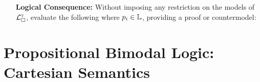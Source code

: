\documentclass[a4paper, 11pt]{article} %
\begin{document}
\begin{enumerate}[leftmargin=1.2in]
  \item[\bf Logical Consequence:] Without imposing any restriction on the models of $\mathcal{L}^{\textsc{t}}_\square$, evaluate the following where $p_i \in \mathbb{L}$, providing a proof or countermodel:
    \begin{enumerate}[label=\arabic*.,resume]\small
    \end{enumerate}
\end{enumerate}




\section*{\sc Propositional Bimodal Logic: Cartesian Semantics}
  
\end{document}
